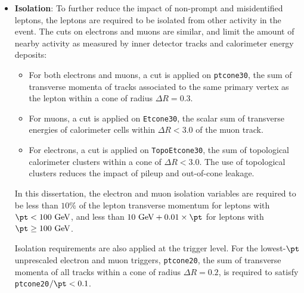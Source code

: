 \begin{itemize}
	\item \textbf{Isolation}: To further reduce the impact of non-prompt and misidentified leptons, the leptons are required to be isolated from other activity in the event. The cuts on electrons and muons are similar, and limit the amount of nearby activity as measured by inner detector tracks and calorimeter energy deposits:

	\begin{itemize}
		\item For both electrons and muons, a cut is applied on \verb.ptcone30., the sum of transverse momenta of tracks associated to the same primary vertex as the lepton within a cone of radius $\Delta R=0.3$. 
		\item For muons, a cut is applied on \verb.Etcone30., the scalar sum of transverse energies of calorimeter cells within $\Delta R<3.0$ of the muon track. 
		\item For electrons, a cut is applied on \verb.TopoEtcone30., the sum of topological calorimeter clusters within a cone of $\Delta R < 3.0$. The use of topological clusters reduces the impact of pileup and out-of-cone leakage.
	\end{itemize}

	In this dissertation, the electron and muon isolation variables are required to be less than $10\%$ of the lepton transverse momentum for leptons with $\pt<100~\mbox{GeV}$, and less than $10~\mbox{GeV}+0.01\times \pt$ for leptons with $\pt\geq 100~\mbox{GeV}$. 

	Isolation requirements are also applied at the trigger level. For the lowest-$\pt$ unprescaled electron and muon triggers, \verb.ptcone20., the sum of transverse momenta of all tracks within a cone of radius $\Delta R=0.2$, is required to satisfy \verb.ptcone20.$/\pt<0.1$. 
\end{itemize}

